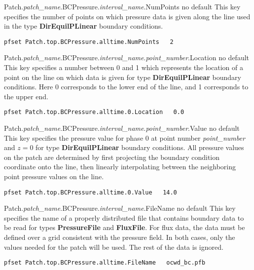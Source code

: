 {Patch.{\em patch\_name}.BCPressure.{\em interval\_name}.NumPoints}
{no default}
{This key specifies the number of points on which pressure data is given along
the line used in the type {\bf DirEquilPLinear} boundary conditions.
}
\begin{display}\begin{verbatim}
pfset Patch.top.BCPressure.alltime.NumPoints   2
\end{verbatim}\end{display}

{Patch.{\em patch\_name}.BCPressure.{\em interval\_name}.{\em point\_number}.Location}
{no default}
{This key specifies a number between 0 and 1 which represents
the location of a point on the line on which data is given for
type {\bf DirEquilPLinear} boundary conditions.
Here 0 corresponds to the lower end of the line, and 1 corresponds to
the upper end.
}
\begin{display}\begin{verbatim}
pfset Patch.top.BCPressure.alltime.0.Location   0.0
\end{verbatim}\end{display}

{Patch.{\em patch\_name}.BCPressure.{\em interval\_name}.{\em point\_number}.Value}
{no default}
{This key specifies the pressure value for phase 0 at point number
{\em point\_number} and $z=0$ for
type {\bf DirEquilPLinear} boundary conditions.
All pressure values on the patch are determined by first projecting the
boundary condition coordinate onto the line, then linearly interpolating
between the neighboring point pressure values on the line.
}
\begin{display}\begin{verbatim}
pfset Patch.top.BCPressure.alltime.0.Value   14.0
\end{verbatim}\end{display}

{Patch.{\em patch\_name}.BCPressure.{\em interval\_name}.FileName}
{no default}
{This key specifies the name of a properly distributed  file
that contains boundary data to be read for types {\bf PressureFile}
and {\bf FluxFile}.  For flux data, the data must be defined over a grid
consistent with the pressure field.  In both cases, only the values needed
for the patch will be used.  The rest of the data is ignored.
}
\begin{display}\begin{verbatim}
pfset Patch.top.BCPressure.alltime.FileName   ocwd_bc.pfb
\end{verbatim}\end{display}



